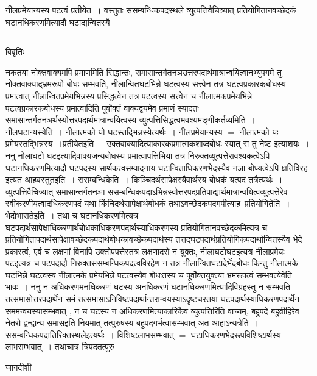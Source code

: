 \documentclass[10pt, openany]{book}
\begin{document}
{{\la नीलप्रमेयान्यस्य पटत्वं प्रतीयेत~। वस्तुतः ससम्बन्धिकपदस्थले व्युत्पत्तिवैचित्र्यात् प्रतियोगितानवच्छेदकं घटानधिकरणमित्यादौ घटाद्यन्वितस्यै}\\
\hrule
\begin{center}     विवृतिः \end{center}
नकतया नोक्तवाक्यमपि प्रमाणमिति सिद्धान्तः, समासान्तर्गतनञउत्तरपदार्थमात्रान्वयित्वानभ्युपगमे तु नोक्तवाक्याद्भ्रमरूपो बोधः सम्भवति, नीलान्वितघटभिन्ने घटत्वस्य सत्त्वेन तत्र घटत्वप्रकारकबोधस्य प्रमात्वात् नीलान्वितप्रमेयभिन्नस्य प्रसिद्धत्वेन तत्र पटत्वस्य सत्त्वेन च नीलात्मकप्रमेयभिन्ने पटत्वप्रकारकबोधस्य प्रमात्वादिति पूर्वोक्तं वाक्यद्वयमेव प्रमाणं स्यादतः समासान्तर्गतनञर्थस्योत्तरपदार्थमात्रान्वयित्वस्य व्युत्पत्तिसिद्धत्वमवश्यमङ्गीकर्तव्यमिति~। {\qt नीलघटान्यस्येति}~। नीलात्मको यो घटस्तद्भिन्नस्येत्यर्थः~। नीलप्रमेयान्यस्य $=$ नीलात्मको यः प्रमेयस्तद्भिन्नस्य~।{\qt प्रतीयेतइति}~। उक्तवाक्यादित्याकारकप्रमात्मकशाब्दबोधः स्यात् स तु नेष्ट इत्याशयः~। ननु नोलाघटो घटइत्यादिवाक्यजन्यबोधस्य प्रमात्वापत्तिभिया तत्र निरुक्तव्युत्पत्तेरावश्यकत्वेऽपि घटानधिकरणमित्यादौ घटपदस्य सार्थकत्वसम्पादनाय घटान्विताधिकरणभेदस्यैव  नञा बोध्यत्वेऽपि क्षतिविरह इत्यत आह\textendash वस्तुतइति~। ससम्बन्धिकेति~। किञ्चिदर्थसापेक्षस्यैवार्थस्य बोधकं यत्पदं तत्रैत्यर्थः~। व्युत्पत्तिवैचित्र्यात् समासान्तर्गतनञा ससम्बन्धिकपदाऽभिन्नस्वोत्तरपदप्रतिपाद्यार्थमात्रान्वयित्वव्युत्पत्तेरेव स्वीकरणीयत्वादधिकरणपदं यथा किंचिदर्थसापेक्षार्थबोधकं तथाऽवच्छेदकपदमपीत्याह\textendash\ {\la प्रतियोगितेति~।} भेदोभासतेइति~। तथा च घटानधिकरणमित्यत्र घटपदार्थसापेक्षाधिकरणार्थबोधकाधिकरणपदार्थस्याधिकरणस्य प्रतियोगितानवच्छेदकमित्यत्र च प्रतियोगितापदार्थसापेक्षावच्छेदकपदार्थबोधकावच्छेकपदार्थस्य
तत्तद्घटपदार्थप्रतियोगिकपदार्थान्वितस्यैव भेदे प्रकारत्वं, एवं च लक्षणां विनापि उक्तोपपत्तेस्तत्र लक्षणादरो न युक्तः, नीलाघटोघटइत्यत्र नीलाप्रमेयः पटइत्यत्र च पटपदादौ
निरुक्तससम्बन्धिकपदत्वविरहेण न तत्र नीलान्वितघटादेर्भेदबोधः किन्तु नीलात्मके घटभिन्ने घटत्वस्य नीलात्मके प्रमेयभिन्ने पटत्वस्यैव बोधःतस्य च पूर्वोक्तयुक्त्या
भ्रमरूपत्वं सम्भवत्येवेति भावः~। ननु न अधिकरणमनधिकरणं घटस्य अनधिकरणं घटानधिकरणमित्यादिविग्रहस्तु न सम्भवति तत्समासोत्तरपदार्थेन समं तत्समासाऽनिविष्टपदार्थान्तरान्वयस्याऽदृष्टचरतया घटपदार्थस्याधिकरणपदार्थेन सममन्वयस्यासम्भवात् , न च घटस्य न अधिकरणमित्याकारिकैव व्युत्पत्तिरिति वाच्यम्,
बहुपदे बहुव्रीहिरेव नेतरो द्वन्द्वान्य समासइति नियमात् तत्पुरुषस्य बहुपदगर्भत्वासम्भवात् अत आहाऽन्यत्रेति~। ससम्बन्धिकपदातिरिक्तस्थलेइत्यर्थः~। विशिष्टलाभसम्भवात् $=$ घटाधिकरणभेदरूपविशिष्टार्थस्य लाभसम्भवात्~। तथाचात्र त्रिपदतत्पुरु
\newpage
\begin{center} जागदीशी \end{center}
}
\end{document}
